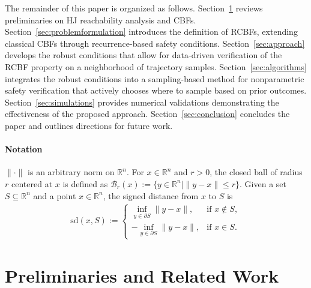\documentclass[letterpaper, 10 pt, conference]{ieeeconf}
\begin{document}
The remainder of this paper is organized as follows. Section~\ref{sec:prelims} reviews preliminaries on HJ reachability analysis and CBFs. Section~\ref{sec:problemformulation} introduces the definition of RCBFs, extending classical CBFs through recurrence-based safety conditions. Section~\ref{sec:approach} develops the robust conditions that allow for data-driven verification of the RCBF property on a neighborhood of trajectory samples. Section~\ref{sec:algorithms} integrates the robust conditions into a sampling-based method for nonparametric safety verification that actively chooses where to sample based on prior outcomes. Section~\ref{sec:simulations} provides numerical validations demonstrating the effectiveness of the proposed approach. Section~\ref{sec:conclusion} concludes the paper and outlines directions for future work.

\paragraph*{Notation} 
$\|\cdot\|$ is an arbitrary norm on $\mathbb{R}^n$.  
For $x \in \mathbb{R}^n$ and $r > 0$, the closed ball of radius $r$ centered at $x$ is defined as $\mathcal{B}_r(x) := \{ y \in \mathbb{R}^n \mid \|y - x\| \leq r \}.$ Given a set $S \subseteq \mathbb{R}^n$ and a point $x \in \mathbb{R}^n$, the signed distance from $x$ to $S$ is  
\begin{align*}
\mathrm{sd}(x,S) :=
\begin{cases}
\inf_{y \in \partial S} \|y - x\|, & \text{if } x \notin S, \\
- \inf_{y \in \partial S} \|y - x\|, & \text{if } x \in S.
\end{cases}
\end{align*}

\section{Preliminaries and Related Work}
\label{sec:prelims}
\end{document}
